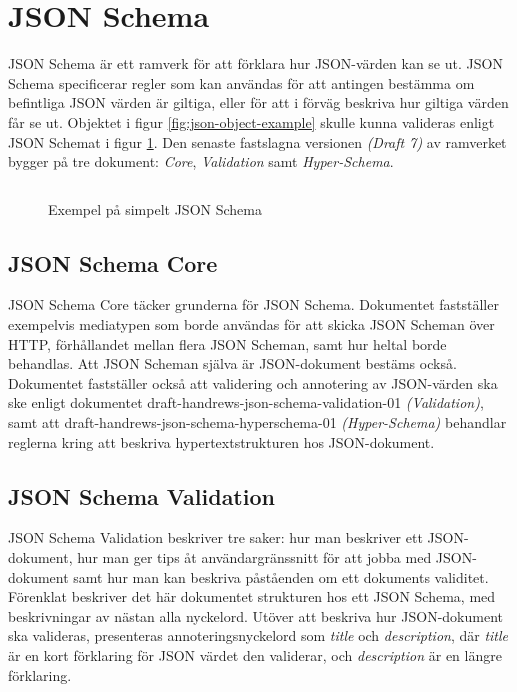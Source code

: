 \section{JSON Schema}
\label{sec:teori:schema}
JSON Schema är ett ramverk för att förklara hur JSON-värden kan se ut. JSON Schema specificerar regler som kan användas för att antingen bestämma om befintliga JSON värden är giltiga, eller för att i förväg beskriva hur giltiga värden får se ut. Objektet i figur \ref{fig:json-object-example} skulle kunna valideras enligt JSON Schemat i figur \ref{fig:json-schema-example}. Den senaste fastslagna versionen \textit{(Draft 7)} av ramverket bygger på tre dokument: \textit{Core}, \textit{Validation} samt \textit{Hyper-Schema}. \cite{A.Wright,Andrews2018,Andrews2018a}

\begin{figure}
	\inputminted[tabsize=2, frame=single, fontsize=\small, framesep=2mm]{json}{code/simple/schema.json}
	\vspace{-1.7em}
	\caption{Exempel på simpelt JSON Schema}
	\label{fig:json-schema-example}
\end{figure}

\subsection{JSON Schema Core}
JSON Schema Core täcker grunderna för JSON Schema. Dokumentet fastställer exempelvis mediatypen som borde användas för att skicka JSON Scheman över HTTP, förhållandet mellan flera JSON Scheman, samt hur heltal borde behandlas. Att JSON Scheman själva är JSON-dokument bestäms också. Dokumentet fastställer också att validering och annotering av JSON-värden ska ske enligt dokumentet draft-handrews-json-schema-validation-01 \textit{(Validation)}, samt att draft-handrews-json-schema-hyperschema-01 \textit{(Hyper-Schema)} behandlar reglerna kring att beskriva hypertextstrukturen hos JSON-dokument. \cite{A.Wright}

\subsection{JSON Schema Validation}
JSON Schema Validation beskriver tre saker: hur man beskriver ett JSON-dokument, hur man ger tips åt användargränssnitt för att jobba med JSON-dokument samt hur man kan beskriva påståenden om ett dokuments validitet. Förenklat beskriver det här dokumentet strukturen hos ett JSON Schema, med beskrivningar av nästan alla nyckelord. Utöver att beskriva hur JSON-dokument ska valideras, presenteras annoteringsnyckelord som \textit{title} och \textit{description}, där \textit{title} är en kort förklaring för JSON värdet den validerar, och \textit{description} är en längre förklaring. \cite{Andrews2018}

